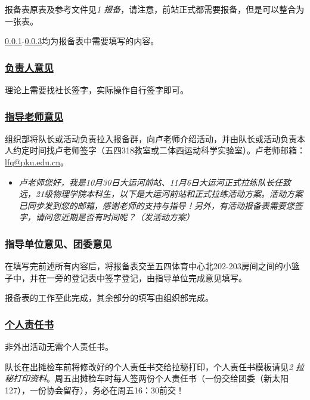 \documentclass[UTF8]{ctexart}
\begin{document}
报备表原表及参考文件见{\color{blue}\textit{1 报备}}，请注意，前站正式都需要报备，但是可以整合为一张表。

\ref{起始}-\ref{结束}均为报备表中需要填写的内容。

\subsubsection[负责人意见]{\underline{负责人意见}}\label{起始}

理论上需要找社长签字，实际操作自行签字即可。

\subsubsection[指导老师意见]{\underline{指导老师意见}}

组织部将队长或活动负责拉入报备群，向卢老师介绍活动，并由队长或活动负责本人约定时间找卢老师签字（五四318教室或二体西运动科学实验室）。卢老师邮箱：\href{mailto:lfq@pku.edu.cn}{lfq@pku.edu.cn}。

\begin{itemize}[nosep]
    \item[] \textit{卢老师您好，我是10月30日大运河前站、11月6日大运河正式拉练队长任致远，21级物理学院本科生，以下是大运河前站和正式拉练活动方案。活动方案已同步发到您的邮箱，感谢老师的支持与指导！另外，有活动报备表需要您签字，请问您近期是否有时间呢？（发活动方案）}
\end{itemize}

\subsubsection{指导单位意见、团委意见}\label{结束}

在填写完前述所有内容后，将报备表交至五四体育中心北202-203房间之间的小篮子中，并在一旁的登记表中签字登记，由指导单位完成意见填写。

报备表的工作至此完成，其余部分的填写由组织部完成。

\subsubsection[个人责任书]{\underline{个人责任书}}

非外出活动无需个人责任书。

队长在出摊检车前将修改好的个人责任书交给拉秘打印，个人责任书模板请见{\color{blue}\textit{2 拉秘打印资料}}。周五出摊检车时每人签两份个人责任书（一份交给团委（新太阳127），一份协会留存），务必在周五16：30前交！
\end{document}
